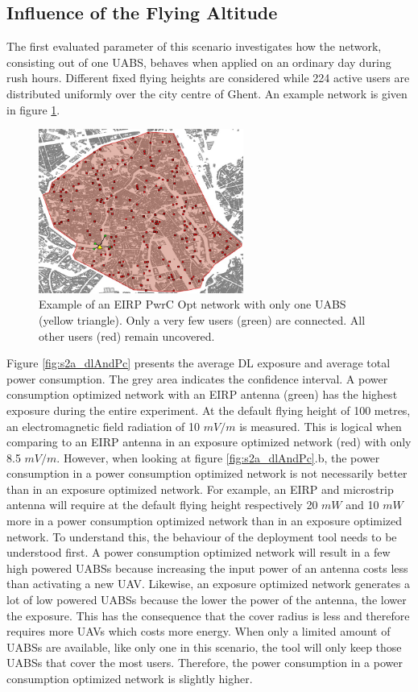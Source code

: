 \subsection{Influence of the Flying Altitude}
The first evaluated parameter of this scenario investigates how the network, consisting out of one \acs{UABS}, behaves when applied on an ordinary day during rush hours. 
Different fixed flying heights are considered while 224 active users are distributed uniformly over the city centre of Ghent. 
An example network is given in figure \ref{fig:s2a:distribution}.
\begin{figure}[h]
  \centering
  \includegraphics[width=0.6\textwidth]{../images/ghentDistribution_pcEIRP_1drone.jpg}
  \caption{Example of an EIRP \gls{PwrC Opt} network with only one \acs{UABS} (yellow triangle). Only a very few users (green) are connected.
  All other users (red) remain uncovered.}
  \label{fig:s2a:distribution}
\end{figure}

Figure \ref{fig:s2a_dlAndPc} presents the average \gls{DL} exposure and average total power consumption. The grey area indicates the confidence interval. 
A power consumption optimized network with an \gls{EIRP} antenna (green) has the highest exposure during the 
entire experiment. At the default flying height of 100 metres, an electromagnetic field radiation 
of 10 $mV/m$ is measured.
This is logical when comparing to an EIRP antenna in an exposure optimized network (red) with only 8.5 $mV/m$. 
However, when looking at figure \ref{fig:s2a_dlAndPc}.b, the power consumption in a power consumption optimized network is not necessarily better 
than in an exposure optimized network. 
For example, an \gls{EIRP} and microstrip antenna will require at the default flying height respectively
20 $mW$ and 10 $mW$ more in a power consumption optimized network than in an exposure optimized network.
To understand this, the behaviour of the deployment tool needs to be understood first. 
A power consumption optimized network will result in a few high powered \gls{UABS}s because increasing the input power of an antenna costs 
less than activating a new  \gls{UAV}. Likewise, an exposure optimized network 
generates a lot of low powered \gls{UABS}s because the lower the power of the antenna, the lower the exposure. This has the consequence that the cover radius 
is less and therefore requires more \gls{UAV}s which costs more energy.
When only a limited amount of \gls{UABS}s are available, 
like only one in this scenario, the tool will only keep those \gls{UABS}s that cover the most users. 
Therefore, the power consumption in a power consumption optimized network is slightly higher. 

